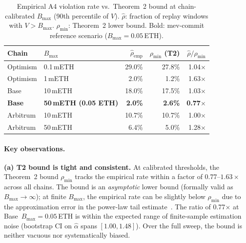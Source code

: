 \begin{table}[h]
\centering
\small
\caption{Empirical A4 violation rate vs.\ Theorem~2 bound at
  chain-calibrated $B_{\max}$ (90th percentile of $V$).
  $\hat{\rho}$: fraction of replay windows with $V > B_{\max}$.
  $\rho_{\min}$: Theorem~2 lower bound.
  Bold: mev-commit reference scenario ($B_{\max} = 0.05$\,ETH).}
\label{tab:calibrated-rhomin}
\begin{tabular}{@{}llrrr@{}}
\toprule
Chain & $B_{\max}$ & $\hat{\rho}_{\text{emp}}$ & $\rho_{\min}$ (T2) & $\hat{\rho}/\rho_{\min}$ \\
\midrule
Optimism  & 0.1\,mETH    & 29.0\% & 27.8\% & 1.04$\times$ \\
Optimism  & 1\,mETH      &  2.0\% &  1.2\% & 1.63$\times$ \\
Base      & 10\,mETH     & 18.0\% & 17.5\% & 1.03$\times$ \\
\textbf{Base} & \textbf{50\,mETH (0.05 ETH)} & \textbf{2.0\%} & \textbf{2.6\%} & \textbf{0.77$\times$} \\
Arbitrum  & 10\,mETH     & 10.7\% & 10.7\% & 1.00$\times$ \\
Arbitrum  & 50\,mETH     &  6.4\% &  5.0\% & 1.28$\times$ \\
\bottomrule
\end{tabular}
\end{table}

\paragraph{Key observations.}

\textbf{(a) T2 bound is tight and consistent.}
At calibrated thresholds, the Theorem~2 bound $\rho_{\min}$ tracks the
empirical rate within a factor of $0.77$--$1.63\times$ across all chains.
The bound is an \emph{asymptotic} lower bound (formally valid as
$B_{\max} \to \infty$); at finite $B_{\max}$, the empirical rate can be
slightly below $\rho_{\min}$ due to the approximation error in the
power-law tail estimate~\cite{Clauset2009}. The ratio of 0.77$\times$ at
Base~$B_{\max} = 0.05$\,ETH is within the expected range of finite-sample
estimation noise (bootstrap CI on $\hat{\alpha}$ spans $[1.00, 1.48]$).
Over the full sweep, the bound is neither vacuous nor systematically
biased.

